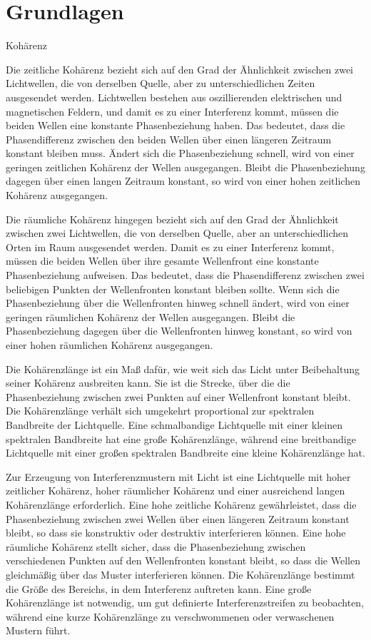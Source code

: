 \documentclass[12pt,english,ngerman]{scrartcl}
\begin{document}
\section{Grundlagen}\label{Grund}


Kohärenz

Die zeitliche Kohärenz bezieht sich auf den Grad der Ähnlichkeit zwischen zwei
Lichtwellen, die von derselben Quelle, aber zu unterschiedlichen Zeiten
ausgesendet werden. Lichtwellen bestehen aus oszillierenden elektrischen und
magnetischen Feldern, und damit es zu einer Interferenz kommt, müssen die
beiden Wellen eine konstante Phasenbeziehung haben. Das bedeutet, dass die
Phasendifferenz zwischen den beiden Wellen über einen längeren Zeitraum
konstant bleiben muss. Ändert sich die Phasenbeziehung schnell, wird von einer
geringen zeitlichen Kohärenz der Wellen ausgegangen. Bleibt die Phasenbeziehung
dagegen über einen langen Zeitraum konstant, so wird von einer hohen zeitlichen
Kohärenz ausgegangen.

Die räumliche Kohärenz hingegen bezieht sich auf den Grad der Ähnlichkeit
zwischen zwei Lichtwellen, die von derselben Quelle, aber an unterschiedlichen
Orten im Raum ausgesendet werden. Damit es zu einer Interferenz kommt, müssen
die beiden Wellen über ihre gesamte Wellenfront eine konstante Phasenbeziehung
aufweisen. Das bedeutet, dass die Phasendifferenz zwischen zwei beliebigen
Punkten der Wellenfronten konstant bleiben sollte. Wenn sich die
Phasenbeziehung über die Wellenfronten hinweg schnell ändert, wird von einer
geringen räumlichen Kohärenz der Wellen ausgegangen. Bleibt die Phasenbeziehung
dagegen über die Wellenfronten hinweg konstant, so wird von einer hohen
räumlichen Kohärenz ausgegangen.

Die Kohärenzlänge ist ein Maß dafür, wie weit sich das Licht unter Beibehaltung
seiner Kohärenz ausbreiten kann. Sie ist die Strecke, über die die
Phasenbeziehung zwischen zwei Punkten auf einer Wellenfront konstant bleibt.
Die Kohärenzlänge verhält sich umgekehrt proportional zur spektralen Bandbreite
der Lichtquelle. Eine schmalbandige Lichtquelle mit einer kleinen spektralen
Bandbreite hat eine große Kohärenzlänge, während eine breitbandige Lichtquelle
mit einer großen spektralen Bandbreite eine kleine Kohärenzlänge hat.

Zur Erzeugung von Interferenzmustern mit Licht ist eine Lichtquelle mit hoher
zeitlicher Kohärenz, hoher räumlicher Kohärenz und einer ausreichend langen
Kohärenzlänge erforderlich. Eine hohe zeitliche Kohärenz gewährleistet, dass
die Phasenbeziehung zwischen zwei Wellen über einen längeren Zeitraum konstant
bleibt, so dass sie konstruktiv oder destruktiv interferieren können. Eine hohe
räumliche Kohärenz stellt sicher, dass die Phasenbeziehung zwischen
verschiedenen Punkten auf den Wellenfronten konstant bleibt, so dass die Wellen
gleichmäßig über das Muster interferieren können. Die Kohärenzlänge bestimmt
die Größe des Bereichs, in dem Interferenz auftreten kann. Eine große
Kohärenzlänge ist notwendig, um gut definierte Interferenzstreifen zu
beobachten, während eine kurze Kohärenzlänge zu verschwommenen oder
verwaschenen Mustern führt.
\end{document}
